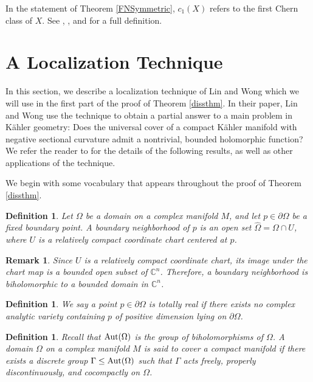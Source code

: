 \documentclass[12pt]{article}
\newcommand{\C}{\mathbb{C}}
\newcommand{\Aut}{\textup{Aut}}
\newtheorem{defnition}[lemma]{Definition}
\newtheorem{remrk}[lemma]{Remark}
\newenvironment{definition}{\begin{defnition} \em}{\end{defnition}}
\newenvironment{remark}{\begin{remrk} \em}{\end{remrk}}
\begin{document}
In the statement of Theorem \ref{FNSymmetric}, $c_1(X)$ refers to the first Chern class of $X$. See \cite{Chern}, \cite{Milnor}, and \cite{Zheng} for a full definition.



\section{A Localization Technique}
\label{LWSec}

In this section, we describe a localization technique of Lin and Wong \cite{LW} which we will use in the first part of the proof of Theorem \ref{dissthm}. In their paper, Lin and Wong use the technique to obtain a partial answer to a main problem in K\"ahler geometry: Does the universal cover of a compact K\"ahler manifold with negative sectional curvature admit a nontrivial, bounded holomorphic function? We refer the reader to \cite{LW} for the details of the following results, as well as other applications of the technique. 

We begin with some vocabulary that appears throughout the proof of Theorem \ref{dissthm}.

\begin{definition}
\label{boundaryneighborhood}
Let $\Omega$ be a domain on a complex manifold $M$, and let $p\in\partial\Omega$ be a fixed boundary point. A \textit{boundary neighborhood of $p$} is an open set $\widehat{\Omega}=\Omega\cap U$, where $U$ is a relatively compact coordinate chart centered at $p$.
\end{definition}

\begin{remark}
\label{BndryDomainisDomain}
Since $U$ is a relatively compact coordinate chart, its image under the chart map is a bounded open subset of $\C^n$. Therefore, a boundary neighborhood is biholomorphic to a bounded domain in $\C^n$.
\end{remark}

\begin{definition}
We say a point $p\in\partial\Omega$ is \textit{totally real} if there exists no complex analytic variety containing $p$ of positive dimension lying on $\partial\Omega$.
\end{definition}

\begin{definition}
\label{covercompactmanifolddef}
Recall that $\Aut(\Omega)$ is the group of biholomorphisms of $\Omega$. A domain $\Omega$ on a complex manifold $M$ is said to \textit{cover a compact manifold} if there exists a discrete group $\Gamma\le\Aut(\Omega)$ such that $\Gamma$ acts freely, properly discontinuously, and cocompactly on $\Omega$. 
\end{definition}
\end{document}
